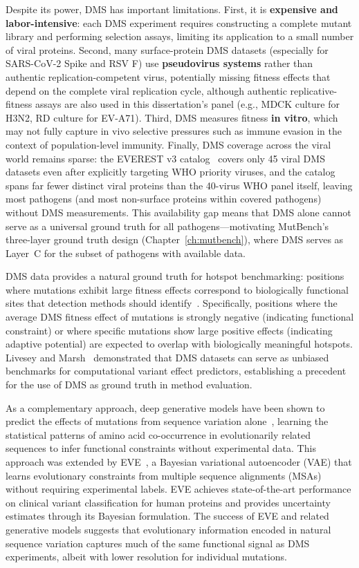 Despite its power, DMS has important limitations.
First, it is \textbf{expensive and labor-intensive}: each DMS experiment requires constructing a complete mutant library and performing selection assays, limiting its application to a small number of viral proteins.
Second, many surface-protein DMS datasets (especially for SARS-CoV-2 Spike and RSV F) use \textbf{pseudovirus systems} rather than authentic replication-competent virus, potentially missing fitness effects that depend on the complete viral replication cycle, although authentic replicative-fitness assays are also used in this dissertation's panel (e.g., MDCK culture for H3N2, RD culture for EV-A71).
Third, DMS measures fitness \textbf{in vitro}, which may not fully capture in vivo selective pressures such as immune evasion in the context of population-level immunity.
Finally, DMS coverage across the viral world remains sparse: the EVEREST v3 catalog~\cite{gurev2026everest_v3} covers only 45 viral DMS datasets even after explicitly targeting WHO priority viruses, and the catalog spans far fewer distinct viral proteins than the 40-virus WHO panel itself, leaving most pathogens (and most non-surface proteins within covered pathogens) without DMS measurements.
This availability gap means that DMS alone cannot serve as a universal ground truth for all pathogens---motivating MutBench's three-layer ground truth design (Chapter~\ref{ch:mutbench}), where DMS serves as Layer~C for the subset of pathogens with available data.

DMS data provides a natural ground truth for hotspot benchmarking: positions where mutations exhibit large fitness effects correspond to biologically functional sites that detection methods should identify~\cite{livesey2020using}.
Specifically, positions where the average DMS fitness effect of mutations is strongly negative (indicating functional constraint) or where specific mutations show large positive effects (indicating adaptive potential) are expected to overlap with biologically meaningful hotspots.
Livesey and Marsh~\cite{livesey2020using} demonstrated that DMS datasets can serve as unbiased benchmarks for computational variant effect predictors, establishing a precedent for the use of DMS as ground truth in method evaluation.

As a complementary approach, deep generative models have been shown to predict the effects of mutations from sequence variation alone~\cite{riesselman2018deep}, learning the statistical patterns of amino acid co-occurrence in evolutionarily related sequences to infer functional constraints without experimental data.
This approach was extended by EVE~\cite{frazer2021eve}, a Bayesian variational autoencoder (VAE) that learns evolutionary constraints from multiple sequence alignments (MSAs) without requiring experimental labels.
EVE achieves state-of-the-art performance on clinical variant classification for human proteins and provides uncertainty estimates through its Bayesian formulation.
The success of EVE and related generative models suggests that evolutionary information encoded in natural sequence variation captures much of the same functional signal as DMS experiments, albeit with lower resolution for individual mutations.


